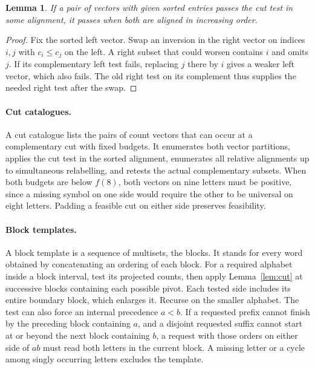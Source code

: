 \documentclass[11pt]{article}
\newtheorem{lemma}[theorem]{Lemma}
\begin{document}
\begin{lemma}\label{lem:align}
If a pair of vectors with given sorted entries passes the cut test in some alignment, it passes when both are aligned in increasing order.
\end{lemma}
\begin{proof}
Fix the sorted left vector. Swap an inversion in the right vector on indices $i,j$ with $c_i\le c_j$ on the left. A right subset that could worsen contains $i$ and omits $j$. If its complementary left test fails, replacing $j$ there by $i$ gives a weaker left vector, which also fails. The old right test on its complement thus supplies the needed right test after the swap.
\end{proof}

\paragraph{Cut catalogues.}
A cut catalogue lists the pairs of count vectors that can occur at a complementary cut with fixed budgets. It enumerates both vector partitions, applies the cut test in the sorted alignment, enumerates all relative alignments up to simultaneous relabelling, and retests the actual complementary subsets. When both budgets are below $f(8)$, both vectors on nine letters must be positive, since a missing symbol on one side would require the other to be universal on eight letters. Padding a feasible cut on either side preserves feasibility.

\paragraph{Block templates.}
A block template is a sequence of multisets, the blocks. It stands for every word obtained by concatenating an ordering of each block. For a required alphabet inside a block interval, test its projected counts, then apply Lemma~\ref{lem:cut} at successive blocks containing each possible pivot. Each tested side includes its entire boundary block, which enlarges it. Recurse on the smaller alphabet. The test can also force an internal precedence $a<b$. If a requested prefix cannot finish by the preceding block containing $a$, and a disjoint requested suffix cannot start at or beyond the next block containing $b$, a request with those orders on either side of $ab$ must read both letters in the current block. A missing letter or a cycle among singly occurring letters excludes the template.
\end{document}
